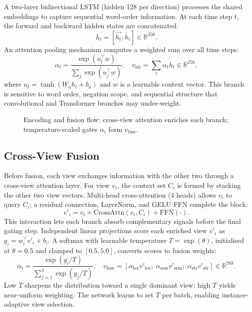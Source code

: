 \documentclass[10pt,twocolumn,a4paper]{article}
\begin{document}
A two-layer bidirectional LSTM (hidden 128 per direction) \citep{ref8} processes the shared embeddings to capture sequential word-order information. At each time step $t$, the forward and backward hidden states are concatenated:
\begin{equation}
h_t = [\overrightarrow{h_t}; \overleftarrow{h_t}] \in \mathbb{R}^{256}.
\end{equation}
An attention pooling mechanism \citep{ref30} computes a weighted sum over all time steps:
\begin{equation}
\alpha_t = \frac{\exp(u_t^\top w)}{\sum_j \exp(u_j^\top w)}, \quad
v_{\mathrm{str}} = \textstyle\sum_t \alpha_t h_t \in \mathbb{R}^{256},
\end{equation}
where $u_t = \tanh(W_a h_t + b_a)$ and $w$ is a learnable context vector. This branch is sensitive to word order, negation scope, and sequential structure that convolutional and Transformer branches may under-weight.

\begin{figure}[!t]
\centering

\caption{Encoding and fusion flow: cross-view attention enriches each branch; temperature-scaled gates $\alpha_i$ form $v_{\mathrm{fuse}}$.}
\label{fig:branches_fusion}
\end{figure}

\subsection{Cross-View Fusion}\label{subsec:crossview}

Before fusion, each view exchanges information with the other two through a cross-view attention layer. For view $v_i$, the context set $C_i$ is formed by stacking the other two view vectors. Multi-head cross-attention (4 heads) allows $v_i$ to query $C_i$; a residual connection, LayerNorm, and GELU FFN complete the block:
\[
v'_i = v_i + \mathrm{CrossAttn}(v_i, C_i) + \mathrm{FFN}(\cdot).
\]
This interaction lets each branch absorb complementary signals before the final gating step. Independent linear projections score each enriched view $v'_i$ as $g_i = w_i^\top v'_i + b_i$. A softmax with learnable temperature $T{=}\exp(\theta)$, initialised at $\theta{=}0.5$ and clamped to $[0.5, 5.0]$, converts scores to fusion weights:
\begin{equation}
\alpha_i = \frac{\exp(g_i / T)}{\sum_{j=1}^{3} \exp(g_j / T)}, \quad
v_{\mathrm{fuse}} = [\alpha_{\mathrm{lex}} v'_{\mathrm{lex}};\; \alpha_{\mathrm{sem}} v'_{\mathrm{sem}};\; \alpha_{\mathrm{str}} v'_{\mathrm{str}}] \in \mathbb{R}^{768}.
\end{equation}
Low $T$ sharpens the distribution toward a single dominant view; high $T$ yields near-uniform weighting. The network learns to set $T$ per batch, enabling instance-adaptive view selection.
\end{document}
